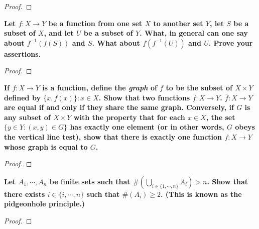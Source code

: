 \documentclass[12pt]{article}
\newenvironment{problem}[2][Problem]{\begin{trivlist}
     \item[\hskip \labelsep {\bfseries #1}\hskip \labelsep {\bfseries #2.}]\bfseries}
{\end{trivlist}}
\begin{document}
\begin{proof}

\end{proof}

\begin{problem}{3.4.2}
Let $f: X \to Y$ be a function from one set $X$ to another set $Y$, let $S$ be a subset of $X$, and let $U$ be a subset of $Y$. What, in general can one say about $f^{-1}(f(S))$ and $S$. What about $f(f^{-1}(U))$ and $U$. Prove your assertions.
\end{problem}

\begin{proof}

\end{proof}

\begin{problem}{3.5.10}
If $f: X \to Y$ is a function, define the \emph{graph} of $f$ to be the subset of $X \times Y$ defined by $\{x, f(x)\} : x \in X$. Show that two functions $f: X \to Y$. $\bar{f}: X \to Y$ are equal if and only if they share the same graph. Conversely, if $G$ is any subset of $X \times Y$ with the property that for each $x \in X$, the set $\{y \in Y : (x,y) \in G\}$ has exactly one element (or in other words, $G$ obeys the vertical line test), show that there is exactly one function $f: X \to Y$ whose graph is equal to $G$.
\end{problem}

\begin{proof}

\end{proof}

\begin{problem}{3.6.10}
Let $A_1, \cdots, A_n$ be finite sets such that $\#(\bigcup_{i \in \{1, \cdots, n\}} A_i) > n$. Show that there exists $i \in \{i, \cdots, n\}$ such that $\#(A_i) \ge 2$. (This is known as the pidgeonhole principle.)
\end{problem}

\begin{proof}

\end{proof}
\end{document}
